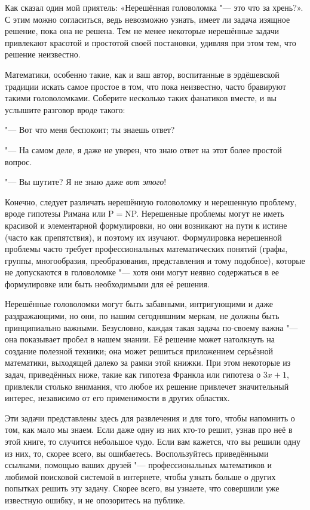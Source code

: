 \documentclass[twoside]{book}
\begin{document}
Как сказал один мой приятель: «Нерешённая головоломка "--- это что за хрень?».
С этим можно согласиться, ведь невозможно узнать,
имеет ли задача изящное решение, пока она не решена.
Тем не менее
некоторые нерешённые задачи привлекают красотой и простотой своей
постановки, удивляя при этом тем, что решение неизвестно.

Математики, особенно такие, как и ваш автор, воспитанные в эрдёшевской
традиции искать самое простое в том, что пока неизвестно, часто
бравируют такими головоломками.
Соберите несколько таких фанатиков
вместе, и вы услышите разговор вроде такого:

"--- Вот что меня беспокоит; ты знаешь ответ?

"--- На самом деле, я даже не уверен, что знаю ответ на этот более
простой вопрос. 

"--- Вы шутите? Я не знаю даже \emph{вот этого}!

Конечно, следует различать нерешённую головоломку и нерешенную
проблему, вроде гипотезы Римана или P${}={}$NP.
Нерешенные проблемы
могут не иметь красивой и элементарной формулировки, но они возникают
на пути к истине (часто как препятствия), и поэтому их изучают.
Формулировка нерешенной проблемы часто требует профессиональных
математических понятий (графы, группы, многообразия, преобразования,
представления и тому подобное), которые не допускаются в головоломке
"--- хотя они могут неявно содержаться в ее формулировке или быть
необходимыми для её решения.

Нерешённые головоломки могут быть забавными, интригующими и даже
раздражающими, но они, по нашим сегодняшним меркам, не должны быть
принципиально важными.
Безусловно, каждая такая задача по-своему
важна "--- она показывает пробел в нашем знании.
Её решение может
натолкнуть на создание полезной техники; она может решиться
приложением серьёзной математики, выходящей далеко за рамки этой
книжки.
При этом некоторые из задач, приведённых ниже, такие как
гипотеза Франкла или гипотеза о $3x+1$, привлекли столько внимания,
что любое их решение привлечет значительный интерес, независимо от его
применимости в других областях.

Эти задачи представлены здесь для развлечения и для того, чтобы
напомнить о том, как мало мы знаем.
Если даже одну из них кто-то
решит, узнав про неё в этой книге, то случится небольшое чудо.
Если
вам кажется, что вы решили одну из них, то, скорее всего, вы
ошибаетесь.
Воспользуйтесь приведёнными ссылками, помощью ваших
друзей "--- профессиональных математиков и любимой поисковой системой
в интернете, чтобы узнать больше о других попытках решить эту задачу.
Скорее всего, вы узнаете, что совершили уже известную ошибку, и не
опозоритесь на публике.
\end{document}
